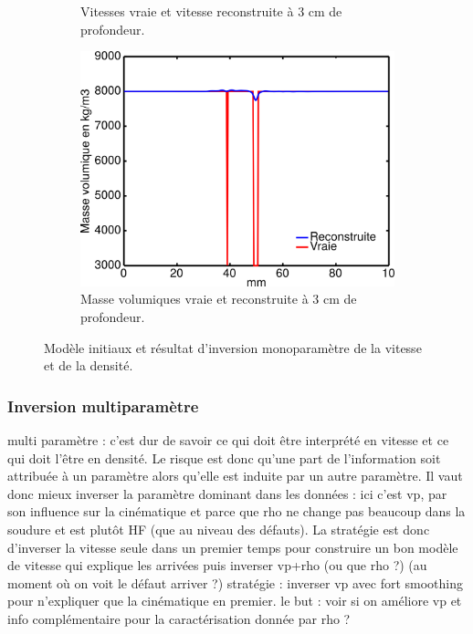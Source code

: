 \begin{figure}[!h]
\begin{changemargin}{-2cm}{-2cm}
\begin{subfigure}[b]{0.29\textwidth}
			\caption{Vitesses vraie et vitesse reconstruite à 3 cm de profondeur.}
		\end{subfigure}
		\begin{subfigure}[b]{0.29\textwidth}
			\caption{ }
		\end{subfigure}
		\begin{subfigure}[b]{0.29\textwidth}
			\includegraphics[width=\textwidth]{img/mono_param/coupe_rho_mono.png}
			\caption{Masse volumiques vraie et reconstruite à 3 cm de profondeur.}
		\end{subfigure}
		\caption{\label{app:inv_mono} Modèle initiaux et résultat d'inversion monoparamètre de la vitesse et de la densité.}
			\end{changemargin}
	\end{figure}




\subsubsection{Inversion multiparamètre}



multi paramètre  : c'est dur de savoir ce qui doit être interprété en vitesse et ce qui doit l'être en densité. Le risque est donc qu'une part de l'information soit attribuée à un paramètre alors qu'elle est induite par un autre paramètre. Il vaut donc mieux inverser la paramètre dominant dans les données : ici c'est vp, par son influence sur la cinématique et parce que rho ne change pas beaucoup dans la soudure et est plutôt HF (que au niveau des défauts). La stratégie est donc d'inverser la vitesse seule dans un premier temps pour construire un bon modèle de vitesse qui explique les arrivées puis inverser vp+rho (ou que rho ?) (au moment où on voit le défaut arriver ?)
stratégie : inverser vp avec fort smoothing pour n'expliquer que la cinématique en premier.
le but : voir si on améliore vp et info complémentaire pour la caractérisation donnée par rho ?


